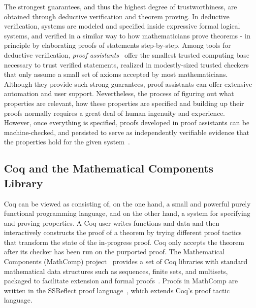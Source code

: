 The strongest guarantees, and thus the highest degree of trustworthiness, are obtained through deductive verification and theorem proving. In deductive verification, systems are modeled and specified inside expressive formal logical systems, and verified in a similar way to how mathematicians prove theorems - in principle by elaborating proofs of statements step-by-step. Among tools for deductive verification, \emph{proof assistants}~\cite{Geuvers2009,Harrison2014} offer the smallest trusted computing base necessary to trust verified statements, realized in modestly-sized trusted checkers that only assume a small set of axioms accepted by most mathematicians. Although they provide such strong guarantees, proof assistants can offer extensive automation and user support. Nevertheless, the process of figuring out what properties are relevant, how these properties are specified and building up their proofs normally requires a great deal of human ingenuity and experience. However, once everything is specified, proofs developed in proof assistants can be machine-checked, and persisted to serve as independently verifiable evidence that the properties hold for the given system~\cite{Pollack1998}.

\subsection{Coq and the Mathematical Components Library}

Coq can be viewed as consisting of, on the one hand, a small and powerful purely functional programming language, and on the other hand, a system for specifying and proving properties. A Coq user writes functions and data and then interactively constructs the proof of a theorem by trying different proof tactics that transform the state of the in-progress proof. Coq only accepts the theorem after its checker has been run on the purported proof. The Mathematical Components (MathComp) project~\cite{MathComp} provides a set of Coq libraries with standard mathematical data structures such as sequences, finite sets, and multisets, packaged to facilitate extension and formal proofs~\cite{Garillot2009}. Proofs in MathComp are written in the SSReflect proof language~\cite{Gonthier2010}, which extends Coq's proof tactic language.


